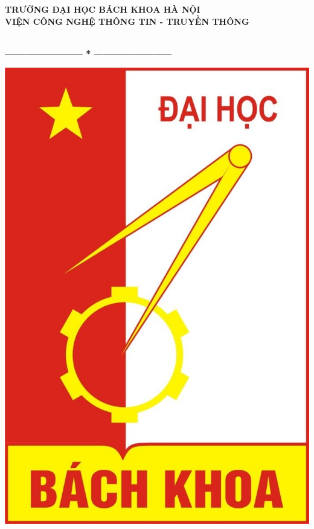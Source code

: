 \documentclass[13pt]{extreport}
\begin{document}
\thispagestyle{empty}
\thisfancypage{
\setlength{\fboxsep}{0pt}
\fbox}{} 
\begin{center}
\begin{large}
\textbf{TRƯỜNG ĐẠI HỌC BÁCH KHOA HÀ NỘI \\ VIỆN CÔNG NGHỆ THÔNG TIN - TRUYỀN THÔNG}
\end{large} \\
\textbf{------------------------  *  ------------------------}\\
\vspace{0.3in}
\begin{center}
\includegraphics[scale=.12]{bachkhoa}\\
\end{center}
\vspace{0.15in}
\begin{center}

\end{center}
\end{center}
\end{document}
